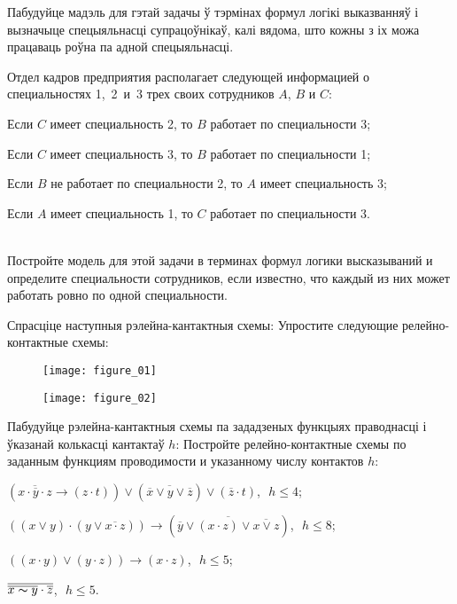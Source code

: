 \documentclass[12pt, a4paper]{article}
\begin{document}
\begin{problemList}
{Пабудуйце мадэль для гэтай задачы ў тэрмінах формул логікі выказванняў і вызначыце спецыяльнасці супрацоўнікаў,
калі вядома, што кожны з іх можа працаваць роўна па адной спецыяльнасці.
}
{%
Отдел кадров предприятия располагает следующей информацией о специальностях 1,~2~и~3 трех своих сотрудников $A$, $B$ и $C$:
\begin{russianEnumerate}
    \item Если $C$ имеет специальность 2, то $B$ работает по специальности 3;
    \item Если $C$ имеет специальность 3, то $B$ работает по специальности 1;
    \item Если $B$ не работает по специальности 2, то $A$ имеет специальность 3;
    \item Если $A$ имеет специальность 1, то $C$ работает по специальности 3.
\end{russianEnumerate}\\
Постройте модель для этой задачи в терминах формул логики высказываний и определите  специальности сотрудников,
если известно, что каждый из них может работать ровно по  одной специальности.
}

\bigskip

\problemItemWithCommonPart
{Спрасціце наступныя рэлейна-кантактныя схемы:}
{Упростите следующие релейно-контактные схемы:}
{%
\begin{figure}[H]
    \begin{center}
        \texttt{[image: figure\_01]}
    \end{center}
\end{figure}

\begin{figure}[H]
    \begin{center}
        \texttt{[image: figure\_02]}
    \end{center}
\end{figure}
}

\smallskip

\problemItemWithCommonPart
{Пабудуйце рэлейна-кантактныя схемы па зададзеных функцыях праводнасці і ўказанай колькасці кантактаў $h$:}
{Постройте релейно-контактные схемы по заданным функциям проводимости и указанному числу контактов $h$:}
{%
\begin{belarusianEnumerate}
    \item $(\overline{x \cdot \overline{y} \cdot z} \to (z \cdot t)) \vee
    (\overline{\overline{x} \vee y \vee \overline{z}}) \vee (\overline{z} \cdot t)$,\,\, $h \le 4$;
    \item $((x \vee y) \cdot (y \vee \overline{x \cdot z})) \to (\overline{\overline{y} \vee
    (x \cdot z) \vee \overline{x \vee z}})$,\,\, $h \le 8$;
    \item $((x \cdot y) \vee (y \cdot z)) \to (x \cdot z)$,\,\, $h \le 5$;
    \item $\overline{\overline{x \thicksim y} \cdot \overline{z}}$,\,\, $h \le 5$.
\end{belarusianEnumerate}
}


\end{problemList}
\end{document}

